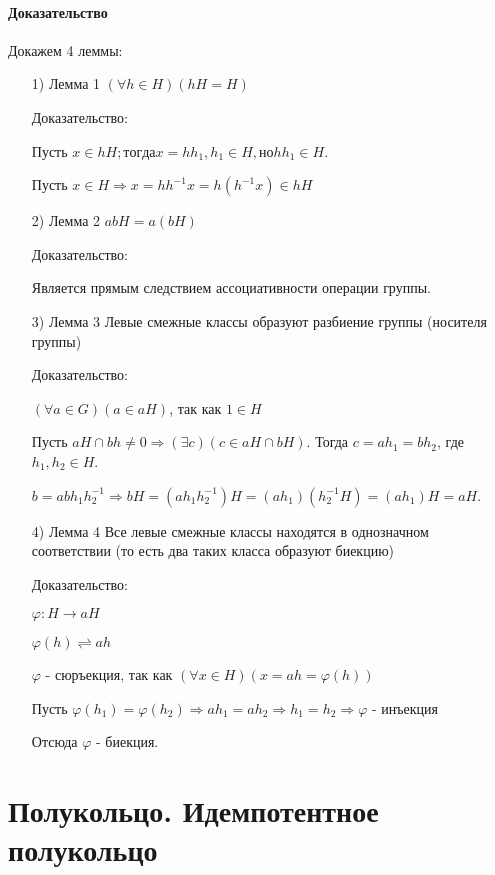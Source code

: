 \documentclass{report}
\begin{document}
\paragraph*{Доказательство}
Докажем 4 леммы:
\begin{itemize}
	\item[1)] Лемма 1\newline
		$(\forall h \in H)(hH = H)$

		Доказательство:

		Пусть $x \in hH; тогда x = hh_1, h_1 \in H, но hh_1 \in H$.

		Пусть $x \in H \Rightarrow x = hh^{-1}x = h(h^{-1}x) \in hH$
	\item[2)] Лемма 2\newline
		$abH = a(bH)$

		Доказательство:

		Является прямым следствием ассоциативности операции группы.
	\item[3)] Лемма 3\newline
		Левые смежные классы образуют разбиение группы (носителя группы)

		Доказательство:

		$(\forall a \in G)(a \in aH)$, так как $1 \in H$

		Пусть $aH \cap bh \neq 0 \Rightarrow (\exists c)(c \in aH \cap bH)$. Тогда
		$c = ah_1 = bh_2$, где $h_1,h_2 \in H$.

		$b = abh_1h^{-1}_2 \Rightarrow bH = (ah_1 h^{-1}_2)H = (ah_1)(h^{-1}_2 H) = (ah_1)H = aH$.
	\item[4)] Лемма 4\newline
		Все левые смежные классы находятся в однозначном соответствии (то есть два таких класса образуют биекцию)

		Доказательство:

		$\varphi: H \to aH$

		$\varphi(h) \rightleftharpoons ah$

		$\varphi$ - сюръекция, так как $(\forall x \in H)(x = ah = \varphi(h))$

		Пусть $\varphi(h_1) = \varphi(h_2) \Rightarrow ah_1 = ah_2 \Rightarrow h_1 = h_2 \Rightarrow \varphi$ - инъекция

		Отсюда $\varphi$ - биекция.
\end{itemize}

\newpage

\section{Полукольцо. Идемпотентное полукольцо}
\end{document}

